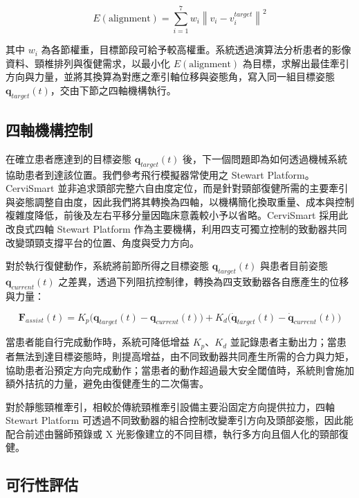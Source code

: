 \documentclass[12pt,a4paper]{article}
\begin{document}
\begin{equation}
E(\text{alignment}) = \sum_{i=1}^{7} w_i \left\| v_i - v_i^{target} \right\|^2
\label{eq:alignment}
\end{equation}

其中 $w_i$ 為各節權重，目標節段可給予較高權重。系統透過演算法分析患者的影像資料、頸椎排列與復健需求，以最小化 $E(\text{alignment})$ 為目標，求解出最佳牽引方向與力量，並將其換算為對應之牽引軸位移與姿態角，寫入同一組目標姿態 $\mathbf{q}_{target}(t)$，交由下節之四軸機構執行。

\subsection{四軸機構控制}

在確立患者應達到的目標姿態 $\mathbf{q}_{target}(t)$ 後，下一個問題即為如何透過機械系統協助患者到達該位置。我們參考飛行模擬器常使用之 Stewart Platform\cite{stewart1965}。CerviSmart 並非追求頭部完整六自由度定位，而是針對頸部復健所需的主要牽引與姿態調整自由度，因此我們將其轉換為四軸，以機構簡化換取重量、成本與控制複雜度降低，前後及左右平移分量因臨床意義較小予以省略。CerviSmart 採用此改良式四軸 Stewart Platform 作為主要機構，利用四支可獨立控制的致動器共同改變頭頸支撐平台的位置、角度與受力方向。

對於執行復健動作，系統將前節所得之目標姿態 $\mathbf{q}_{target}(t)$ 與患者目前姿態 $\mathbf{q}_{current}(t)$ 之差異，透過下列阻抗控制律，轉換為四支致動器各自應產生的位移與力量：

\begin{equation}
\mathbf{F}_{assist}(t) = K_p\big(\mathbf{q}_{target}(t) - \mathbf{q}_{current}(t)\big) + K_d\big(\dot{\mathbf{q}}_{target}(t) - \dot{\mathbf{q}}_{current}(t)\big)
\label{eq:impedance}
\end{equation}

當患者能自行完成動作時，系統可降低增益 $K_p$、$K_d$ 並記錄患者主動出力；當患者無法到達目標姿態時，則提高增益，由不同致動器共同產生所需的合力與力矩，協助患者沿預定方向完成動作；當患者的動作超過最大安全閾值時，系統則會施加額外拮抗的力量，避免由復健產生的二次傷害。

對於靜態頸椎牽引，相較於傳統頸椎牽引設備主要沿固定方向提供拉力\cite{abi-aad2023}，四軸 Stewart Platform 可透過不同致動器的組合控制改變牽引方向及頭部姿態，因此能配合前述由醫師預錄或 X 光影像建立的不同目標，執行多方向且個人化的頸部復健。

\subsection{可行性評估}
\end{document}
